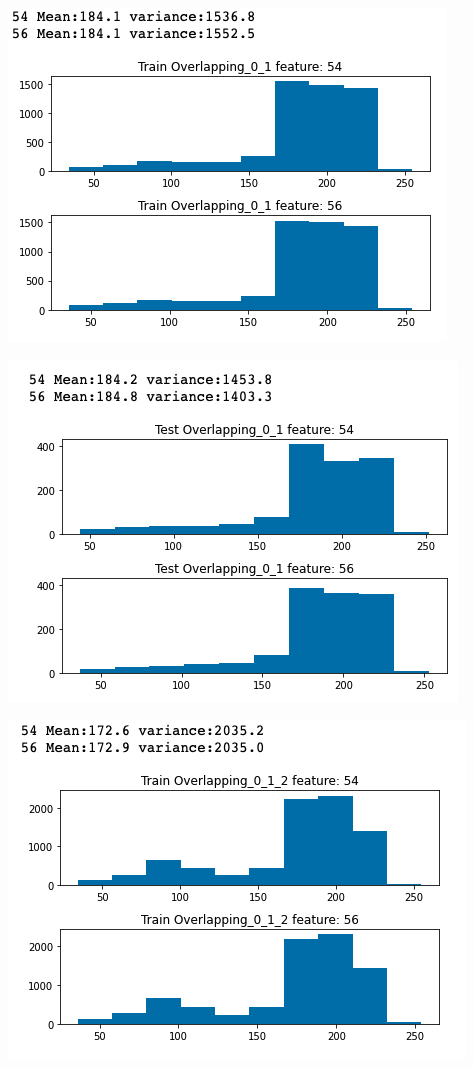 \documentclass[12pt]{article}
\begin{document}
\begin{multicols*}{2}
\begin{center}
		\includegraphics[scale=0.3]{../screenshot/train_over_01.png}

		\includegraphics[scale=0.3]{../screenshot/test_over_01.png}

		\includegraphics[scale=0.3]{../screenshot/train_over_012.png}


\end{center}
\end{multicols*}
\end{document}
